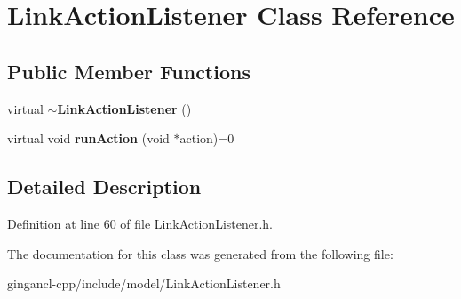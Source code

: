 \section{LinkActionListener Class Reference}
\label{classbr_1_1pucrio_1_1telemidia_1_1ginga_1_1ncl_1_1model_1_1link_1_1LinkActionListener}
\subsection*{Public Member Functions}
\begin{CompactItemize}
\item 
virtual {\bf $\sim$LinkActionListener} ()\label{classbr_1_1pucrio_1_1telemidia_1_1ginga_1_1ncl_1_1model_1_1link_1_1LinkActionListener_a488a47879ba5809d1b49f5198e038c3}

\item 
virtual void \textbf{runAction} (void $\ast$action)=0\label{classbr_1_1pucrio_1_1telemidia_1_1ginga_1_1ncl_1_1model_1_1link_1_1LinkActionListener_4bb259dd60a34a243d45d49e8621789d}

\end{CompactItemize}


\subsection{Detailed Description}




Definition at line 60 of file LinkActionListener.h.

The documentation for this class was generated from the following file:\begin{CompactItemize}
\item 
gingancl-cpp/include/model/LinkActionListener.h\end{CompactItemize}
